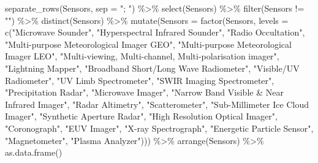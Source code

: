 \documentclass[
]{article}
\newenvironment{Shaded}{\begin{snugshade}}{\end{snugshade}}
\newcommand{\AttributeTok}[1]{\textcolor[rgb]{0.77,0.63,0.00}{#1}}
\newcommand{\FunctionTok}[1]{\textcolor[rgb]{0.00,0.00,0.00}{#1}}
\newcommand{\NormalTok}[1]{#1}
\newcommand{\SpecialCharTok}[1]{\textcolor[rgb]{0.00,0.00,0.00}{#1}}
\newcommand{\StringTok}[1]{\textcolor[rgb]{0.31,0.60,0.02}{#1}}
\begin{document}
\begin{Shaded}
\begin{Highlighting}[]
  \FunctionTok{separate\_rows}\NormalTok{(Sensors, }\AttributeTok{sep =} \StringTok{"; "}\NormalTok{) }\SpecialCharTok{\%\textgreater{}\%}
  \FunctionTok{select}\NormalTok{(Sensors) }\SpecialCharTok{\%\textgreater{}\%}
  \FunctionTok{filter}\NormalTok{(Sensors }\SpecialCharTok{!=} \StringTok{""}\NormalTok{) }\SpecialCharTok{\%\textgreater{}\%}
  \FunctionTok{distinct}\NormalTok{(Sensors) }\SpecialCharTok{\%\textgreater{}\%} 
  \FunctionTok{mutate}\NormalTok{(}\AttributeTok{Sensors =} \FunctionTok{factor}\NormalTok{(Sensors, }\AttributeTok{levels =} \FunctionTok{c}\NormalTok{(}\StringTok{"Microwave Sounder"}\NormalTok{, }\StringTok{"Hyperspectral Infrared Sounder"}\NormalTok{, }
                                              \StringTok{"Radio Occultation"}\NormalTok{, }\StringTok{"Multi{-}purpose Meteorological Imager GEO"}\NormalTok{, }
                                              \StringTok{"Multi{-}purpose Meteorological Imager LEO"}\NormalTok{, }\StringTok{"Multi{-}viewing, Multi{-}channel, Multi{-}polarisation imager"}\NormalTok{, }
                                              \StringTok{"Lightning Mapper"}\NormalTok{, }\StringTok{"Broadband Short/Long Wave Radiometer"}\NormalTok{, }
                                              \StringTok{"Visible/UV Radiometer"}\NormalTok{, }\StringTok{"UV Limb Spectrometer"}\NormalTok{, }
                                              \StringTok{"SWIR Imaging Spectrometer"}\NormalTok{, }\StringTok{"Precipitation Radar"}\NormalTok{, }
                                              \StringTok{"Microwave Imager"}\NormalTok{, }\StringTok{"Narrow Band Visible \& Near Infrared Imager"}\NormalTok{, }
                                              \StringTok{"Radar Altimetry"}\NormalTok{, }\StringTok{"Scatterometer"}\NormalTok{, }
                                              \StringTok{"Sub{-}Millimeter Ice Cloud Imager"}\NormalTok{, }\StringTok{"Synthetic Aperture Radar"}\NormalTok{, }
                                              \StringTok{"High Resolution Optical Imager"}\NormalTok{, }\StringTok{"Coronograph"}\NormalTok{, }
                                              \StringTok{"EUV Imager"}\NormalTok{, }\StringTok{"X{-}ray Spectrograph"}\NormalTok{, }
                                              \StringTok{"Energetic Particle Sensor"}\NormalTok{, }\StringTok{"Magnetometer"}\NormalTok{, }\StringTok{"Plasma Analyzer"}\NormalTok{))) }\SpecialCharTok{\%\textgreater{}\%}
  \FunctionTok{arrange}\NormalTok{(Sensors) }\SpecialCharTok{\%\textgreater{}\%} 
  \FunctionTok{as.data.frame}\NormalTok{()}
\end{Highlighting}
\end{Shaded}
\end{document}
